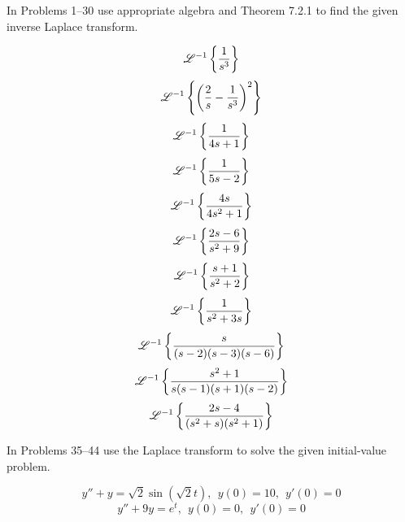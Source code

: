 \documentclass[chapter=7,section=2]{math252homework}
\begin{document}
\noindent In Problems 1--30 use appropriate algebra and Theorem 7.2.1 to find the given inverse Laplace transform.

\begin{problems}
	\problem \[ \mathscr{L}^{-1}\left\{ \frac{1}{s^{3}} \right\} \]										%
	\setcounter{problemsi}{3}
	\problem \[ \mathscr{L}^{-1} \left\{ \left( \frac{2}{s} - \frac{1}{s^{3}} \right)^{2} \right\} \]		%
	\setcounter{problemsi}{8}
	\problem \[ \mathscr{L}^{-1} \left\{ \frac{1}{4s+1} \right\} \]										%
	\problem \[ \mathscr{L}^{-1} \left\{ \frac{1}{5s-2} \right\} \]										%
	\setcounter{problemsi}{12}
	\problem \[ \mathscr{L}^{-1} \left\{ \frac{4s}{4s^{2} + 1} \right\} \]									%
	\setcounter{problemsi}{14}
	\problem \[ \mathscr{L}^{-1} \left\{ \frac{2s-6}{s^{2} + 9} \right\} \]								%
	\problem \[ \mathscr{L}^{-1} \left\{ \frac{s+1}{s^{2}+2} \right\} \]									%
	\problem \[ \mathscr{L}^{-1} \left\{ \frac{1}{s^{2} + 3s} \right\} \]									%
	\setcounter{problemsi}{22}
	\problem \[ \mathscr{L}^{-1} \left\{ \frac{s}{(s-2)(s-3)(s-6)} \right\} \]								%
	\problem \[ \mathscr{L}^{-1} \left\{ \frac{s^{2} + 1}{s(s-1)(s+1)(s-2)} \right\} \]					%
	\setcounter{problemsi}{26}
	\problem \[ \mathscr{L}^{-1} \left\{ \frac{2s-4}{(s^{2}+s)(s^{2}+1)} \right\} \]						%
\end{problems}

\noindent In Problems 35--44 use the Laplace transform to solve the given initial-value problem.
\begin{problems}[start=41]
	\problem \[ y'' + y = \sqrt{2}\sin\left(\sqrt{2}t\right),\ \ y(0)=10,\ \ y'(0)=0 \]					%
	\problem \[ y'' + 9y = e^{t},\ \ y(0)=0,\ \ y'(0)=0 \]												%
\end{problems}
\end{document}
